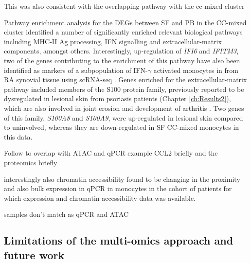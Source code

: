 This was also consistent with  the overlapping pathway with the cc-mixed cluster

Pathway enrichment analysis for the DEGs between SF and PB in the CC-mixed cluster identified a number of significantly enriched relevant biological pathways including MHC-II Ag processing, IFN signalling and extracellular-matrix components, amongst others. Interestingly, up-regulation of \textit{IFI6} and \textit{IFITM3}, two of the genes contributing to the enrichment of this pathway have also been identified as markers of a subpopulation of IFN-$\gamma$ activated monocytes in from RA synovial tissue using scRNA-seq \parencite{Zhang2018}. Genes enriched for the extracellular-matrix pathway included members of the S100 protein family, previously reported to be dysregulated in lesional skin from psoriasis patients (Chapter \ref{ch:Results2}), which are also involved in joint erosion and development of arthritis \parencite{Raghunatha2012}. Two genes of this family, \textit{S100A8} and \textit{S100A9}, were up-regulated in lesional skin compared to uninvolved, whereas they are down-regulated in SF CC-mixed monocytes in this data.

Follow to overlap with ATAC and qPCR example CCL2 briefly and the proteomics briefly







 interestingly also chromatin accessibility found to be changing in the proximity and also bulk expression in qPCR in monocytes in the cohort of patients for which expression and chromatin accessibility data was available.



samples don't match as qPCR and ATAC

\subsection{Limitations of the multi-omics approach and future work}
\label{Discussion_scRNAseq}

